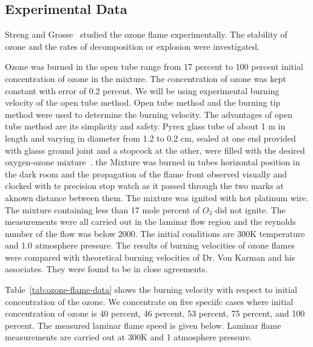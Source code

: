 \subsection{Experimental Data}

Streng and Grosse~\cite{Streng} studied the ozone
flame experimentally. The stability of ozone and the rates of
decomposition or explosion were investigated.%
 
Ozone was burned in the open tube
range from 17 percent to 100 percent initial concentration of ozone in
the mixture. 
The concentration of ozone was kept constant with error of 0.2
percent. We will be using experimental
burning velocity of the open tube method. Open tube method and the burning tip method were used to determine the burning velocity. The advantages of open tube method are its simplicity and safety. 
Pyrex glass tube of about 1 m in length and varying in diameter from 1.2 to 0.2 cm, sealed at one end provided with glasss ground joint and a stopcock at the other, were filled with the desired oxygen-ozone mixture~\cite{Streng}.
the Mixture was burned in tubes horizontal position in the dark room and the propagation of the flame front observed visually and clocked with te precision stop watch as it passed through the two marks at aknown distance between them. The mixture was ignited with hot platinum wire. The mixture containing less than 17 mole percent of $O_3$ did not ignite.   The measurements were all carried out in the laminar
flow region and the reynolds number of the flow was below 2000. The
initial conditions are 300K temperature and 1.0 atmosphere
pressure. The results of burning velocities of ozone flames were
compared with theoretical burning velocities of Dr. Von Karman and his
associates. They were found to be in close agreements.



Table~\ref{tab:ozone-flame-data} shows the burning
velocity with respect to initial concentration of the ozone. We
concentrate on five speciifc cases where initial concentration of ozone
is 40 percent, 46 percent, 53 percent, 75 percent, and 100 percent. The
measured laminar flame speed is given below. Laminar flame
measurements are carried out at 300K and 1 atmosphere pressure.

